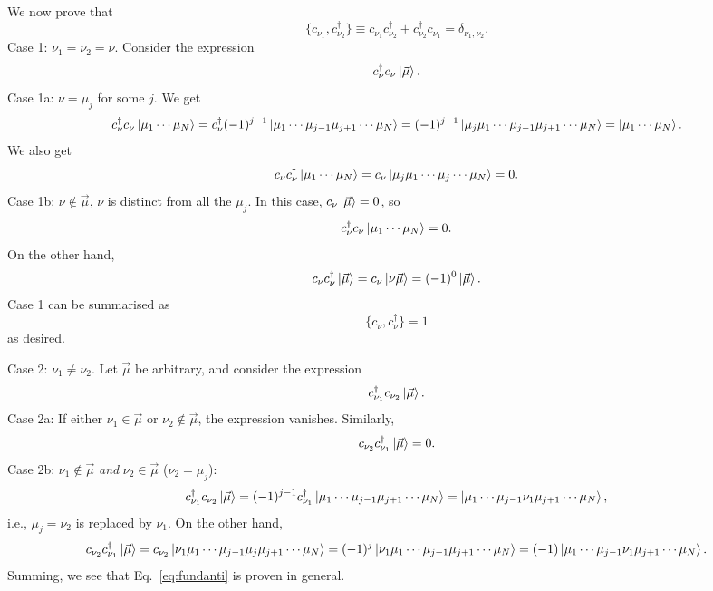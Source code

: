 \documentclass{report}
\theoremstyle{plain}
\theoremstyle{definition}
\begin{document}
We now prove that
\begin{equation}
  \{ c_{\nu_1}, c^\dag_{\nu_2} \} \equiv c_{\nu_1} c^\dag_{\nu_2} +
  c^\dag_{\nu_2} c_{\nu_1} = \delta_{\nu_1,\nu_2}. \label{eq:fundanti}
\end{equation}
Case 1: $\nu_1 = \nu_2 = \nu$. Consider the expression
\begin{equation}
  c^\dag_\nu c_\nu \ket{\vec{\mu}}.
\end{equation}
Case 1a: $\nu = \mu_j$ for some $j$. We get
\begin{equation}
  c^\dag_\nu c_\nu \ket{\mu_1\cdots\mu_N} = c^\dag_\nu (-1)^{j-1}
  \ket{\mu_1\cdots\mu_{j-1}\mu_{j+1}\cdots\mu_N} = (-1)^{j-1}
  \ket{\mu_j\mu_1\cdots\mu_{j-1}\mu_{j+1}\cdots\mu_N} =
  \ket{\mu_1\cdots\mu_N}.
\end{equation}
We also get
\begin{equation}
  c_\nu c^\dag_\nu \ket{\mu_1\cdots \mu_N} = c_\nu
  \ket{\mu_j\mu_1\cdots\mu_j\cdots\mu_N} = 0.
\end{equation}
Case 1b: $\nu \notin \vec{\mu}$, $\nu$ is distinct from all the
$\mu_j$. In this case, $c_\nu\ket{\vec{\mu}} = 0$, so
\begin{equation}
  c^\dag_\nu c_\nu \ket{\mu_1\cdots \mu_N} = 0.
\end{equation}
On the other hand,
\begin{equation}
  c_\nu c^\dag_\nu \ket{\vec{\mu}} = c_\nu \ket{\nu\vec{\mu}} = (-1)^0
  \ket{\vec{\mu}}.
\end{equation}
Case 1 can be summarised as
\begin{equation}
  \{ c_\nu, c^\dag_\nu\} = 1
\end{equation}
as desired.

Case 2: $\nu_1\neq \nu_2$. Let $\vec{\mu}$ be arbitrary, and consider
the expression
\begin{equation}
  c^\dag_{\nu_1} c_{\nu_2} \ket{\vec{\mu}}.
\end{equation}
Case 2a: If either $\nu_1\in\vec{\mu}$ or $\nu_2\notin\vec{\mu}$, the
expression vanishes. Similarly,
\begin{equation}
  c_{\nu_2} c^\dag_{\nu_1} \ket{\vec{\mu}} = 0.
\end{equation}
Case 2b: $\nu_1 \notin \vec{\mu}$ \emph{and} $\nu_2 \in \vec{\mu}$
($\nu_2 = \mu_j$):
\begin{equation}
  c^\dag_{\nu_1} c_{\nu_2} \ket{\vec{\mu}} = (-1)^{j-1} c^\dag_{\nu_1}
  \ket{\mu_1\cdots\mu_{j-1}\mu_{j+1} \cdots\mu_N} =
  \ket{\mu_1\cdots\mu_{j-1}\nu_1\mu_{j+1}\cdots\mu_N},
\end{equation}
i.e., $\mu_j=\nu_2$ is replaced by $\nu_1$. On the other hand,
\begin{equation}
  c_{\nu_2} c^\dag_{\nu_1} \ket{\vec{\mu}} = c_{\nu_2}
  \ket{\nu_1\mu_1\cdots\mu_{j-1}\mu_j\mu_{j+1} \cdots\mu_N} =
  (-1)^j \ket{\nu_1\mu_1\cdots\mu_{j-1}\mu_{j+1}\cdots\mu_N}
  = (-1)\ket{\mu_1\cdots\mu_{j-1}\nu_1\mu_{j+1}\cdots\mu_N}.
\end{equation} 
Summing, we see that Eq.~\eqref{eq:fundanti} is proven in general.
\end{document}
